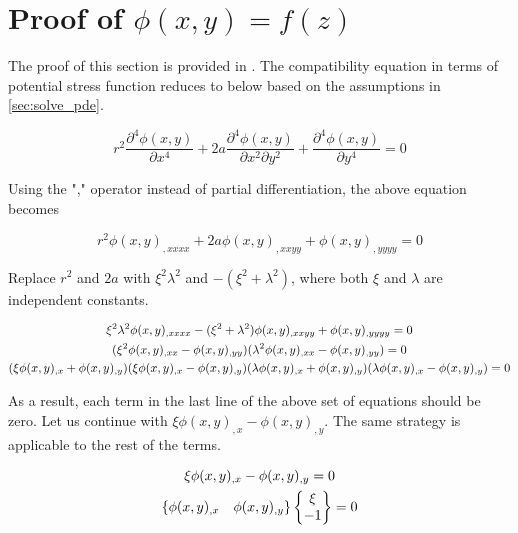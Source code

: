 \section{Proof of \texorpdfstring{$\phi(x, y) = f(z)$}{}}\label{app:why_z_is_complex}
The proof of this section is provided in \cite{Koussios2015}. The compatibility equation in terms of potential stress function reduces to below based on the assumptions in \cref{sec:solve_pde}.

\begin{equation*}
    r^2 \frac{\partial^4 \phi(x, y)}{\partial x^4} + 2a \frac{\partial^4 \phi(x, y)}{\partial x^2 \partial y^2} + \frac{\partial^4 \phi(x, y)}{\partial y^4} = 0
\end{equation*}

Using the "," operator instead of partial differentiation, the above equation becomes

\begin{equation*}
    r^2 \phi(x, y)_{,xxxx} + 2a \phi(x, y)_{,xxyy} + \phi(x, y)_{,yyyy} = 0
\end{equation*}

Replace $r^2$ and $2a$ with $\xi^2\lambda^2$ and $-(\xi^2 + \lambda^2)$, where both $\xi$ and $\lambda$ are independent constants.

\begin{gather*}
    \xi^2\lambda^2 \phi(x, y)_{,xxxx} -(\xi^2 + \lambda^2) \phi(x, y)_{,xxyy} + \phi(x, y)_{,yyyy} = 0 \notag\\
    (\xi^2 \phi(x, y)_{,xx} - \phi(x, y)_{,yy})(\lambda^2 \phi(x, y)_{,xx} - \phi(x, y)_{,yy}) = 0 \notag\\
    (\xi \phi(x, y)_{,x} + \phi(x, y)_{,y}) (\xi \phi(x, y)_{,x} - \phi(x, y)_{,y}) (\lambda \phi(x, y)_{,x} + \phi(x, y)_{,y}) (\lambda \phi(x, y)_{,x} - \phi(x, y)_{,y}) = 0
\end{gather*}

As a result, each term in the last line of the above set of equations should be zero. Let us continue with $\xi \phi(x, y)_{,x} - \phi(x, y)_{,y}$. The same strategy is applicable to the rest of the terms. 

\begin{gather*}
    \xi \phi(x, y)_{,x} - \phi(x, y)_{,y} = 0\notag\\
    \{ \phi(x, y)_{,x} \quad \phi(x, y)_{,y}\} 
    \begin{Bmatrix}
    \xi\\ 
    -1
    \end{Bmatrix} = 0
\end{gather*}

